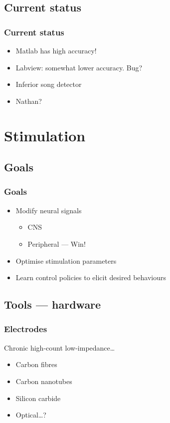 \documentclass{beamer}
\begin{document}
\subsection{Current status}

\begin{frame}
  \frametitle{Current status}
  \begin{itemize}
    \item Matlab has high accuracy!
    \item Labview: somewhat lower accuracy.  Bug?
    \item Inferior song detector
    \item Nathan?
  \end{itemize}
\end{frame}


\section{Stimulation}
\subsection{Goals}

\begin{frame}
  \frametitle{Goals}
  \begin{itemize}
  \item Modify neural signals
    \begin{itemize}
    \item CNS
    \item Peripheral --- Win!
    \end{itemize}
  \item Optimise stimulation parameters
  \item Learn control policies to elicit desired behaviours
  \end{itemize}
\end{frame}


\subsection{Tools --- hardware}

\begin{frame}
  \frametitle{Electrodes}
  Chronic high-count low-impedance\dots
  \begin{itemize}
    \item Carbon fibres
    \item Carbon nanotubes
    \item Silicon carbide
    \item Optical\dots?
  \end{itemize}
\end{frame}
\end{document}
